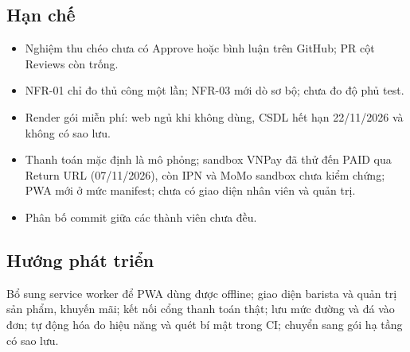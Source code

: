 \documentclass[a4paper]{article}
\begin{document}
\subsection{Hạn chế}\label{sec:se-hanche}
\begin{itemize}
\item Nghiệm thu chéo chưa có Approve hoặc bình luận trên GitHub; PR cột Reviews còn trống.
\item NFR-01 chỉ đo thủ công một lần; NFR-03 mới dò sơ bộ; chưa đo độ phủ test.
\item Render gói miễn phí: web ngủ khi không dùng, CSDL hết hạn 22/11/2026 và không có sao lưu.
\item Thanh toán mặc định là mô phỏng; sandbox VNPay đã thử đến PAID qua Return URL (07/11/2026), còn IPN và MoMo sandbox chưa kiểm chứng; PWA mới ở mức manifest; chưa có giao diện nhân viên và quản trị.
\item Phân bố commit giữa các thành viên chưa đều.
\end{itemize}

\subsection{Hướng phát triển}\label{sec:se-huong}
Bổ sung service worker để PWA dùng được offline; giao diện barista và quản trị sản phẩm, khuyến mãi; kết nối cổng thanh toán thật; lưu mức đường và đá vào đơn; tự động hóa đo hiệu năng và quét bí mật trong CI; chuyển sang gói hạ tầng có sao lưu.

\clearpage
\appendix
\end{document}
